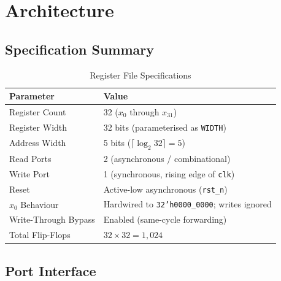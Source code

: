 \documentclass[12pt,a4paper]{article}
\begin{document}
\section{Architecture}

\subsection{Specification Summary}

\begin{table}[H]
    \centering
    \begin{tabularx}{\textwidth}{@{} l X @{}}
        \toprule
        \textbf{Parameter} & \textbf{Value} \\
        \midrule
        Register Count & 32 ($x_0$ through $x_{31}$) \\
        Register Width & 32 bits (parameterised as \texttt{WIDTH}) \\
        Address Width & 5 bits ($\lceil\log_2 32\rceil = 5$) \\
        Read Ports & 2 (asynchronous / combinational) \\
        Write Port & 1 (synchronous, rising edge of \texttt{clk}) \\
        Reset & Active-low asynchronous (\texttt{rst\_n}) \\
        $x_0$ Behaviour & Hardwired to \texttt{32'h0000\_0000}; writes ignored \\
        Write-Through Bypass & Enabled (same-cycle forwarding) \\
        Total Flip-Flops & $32 \times 32 = 1{,}024$ \\
        \bottomrule
    \end{tabularx}
    \caption{Register File Specifications}
\end{table}

\subsection{Port Interface}
\end{document}
